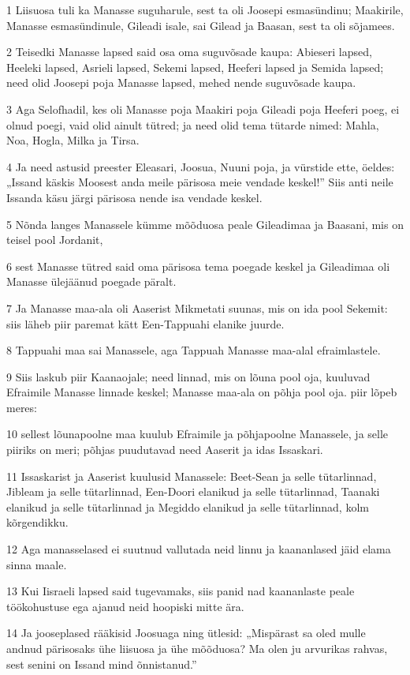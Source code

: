 \par 1 Liisuosa tuli ka Manasse suguharule, sest ta oli Joosepi esmasündinu; Maakirile, Manasse esmasündinule, Gileadi isale, sai Gilead ja Baasan, sest ta oli sõjamees.
\par 2 Teisedki Manasse lapsed said osa oma suguvõsade kaupa: Abieseri lapsed, Heeleki lapsed, Asrieli lapsed, Sekemi lapsed, Heeferi lapsed ja Semida lapsed; need olid Joosepi poja Manasse lapsed, mehed nende suguvõsade kaupa.
\par 3 Aga Selofhadil, kes oli Manasse poja Maakiri poja Gileadi poja Heeferi poeg, ei olnud poegi, vaid olid ainult tütred; ja need olid tema tütarde nimed: Mahla, Noa, Hogla, Milka ja Tirsa.
\par 4 Ja need astusid preester Eleasari, Joosua, Nuuni poja, ja vürstide ette, öeldes: „Issand käskis Moosest anda meile pärisosa meie vendade keskel!” Siis anti neile Issanda käsu järgi pärisosa nende isa vendade keskel.
\par 5 Nõnda langes Manassele kümme mõõduosa peale Gileadimaa ja Baasani, mis on teisel pool Jordanit,
\par 6 sest Manasse tütred said oma pärisosa tema poegade keskel ja Gileadimaa oli Manasse ülejäänud poegade päralt.
\par 7 Ja Manasse maa-ala oli Aaserist Mikmetati suunas, mis on ida pool Sekemit: siis läheb piir paremat kätt Een-Tappuahi elanike juurde.
\par 8 Tappuahi maa sai Manassele, aga Tappuah Manasse maa-alal efraimlastele.
\par 9 Siis laskub piir Kaanaojale; need linnad, mis on lõuna pool oja, kuuluvad Efraimile Manasse linnade keskel; Manasse maa-ala on põhja pool oja. piir lõpeb meres:
\par 10 sellest lõunapoolne maa kuulub Efraimile ja põhjapoolne Manassele, ja selle piiriks on meri; põhjas puudutavad need Aaserit ja idas Issaskari.
\par 11 Issaskarist ja Aaserist kuulusid Manassele: Beet-Sean ja selle tütarlinnad, Jibleam ja selle tütarlinnad, Een-Doori elanikud ja selle tütarlinnad, Taanaki elanikud ja selle tütarlinnad ja Megiddo elanikud ja selle tütarlinnad, kolm kõrgendikku.
\par 12 Aga manasselased ei suutnud vallutada neid linnu ja kaananlased jäid elama sinna maale.
\par 13 Kui Iisraeli lapsed said tugevamaks, siis panid nad kaananlaste peale töökohustuse ega ajanud neid hoopiski mitte ära.
\par 14 Ja jooseplased rääkisid Joosuaga ning ütlesid: „Mispärast sa oled mulle andnud pärisosaks ühe liisuosa ja ühe mõõduosa? Ma olen ju arvurikas rahvas, sest senini on Issand mind õnnistanud.”
